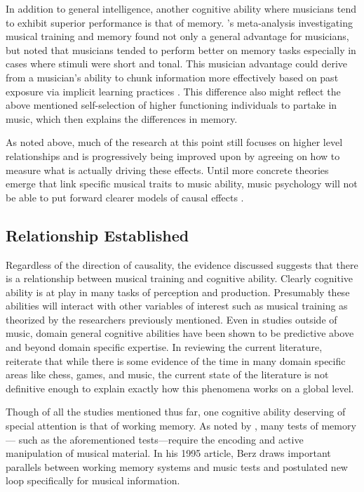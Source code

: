 \documentclass[12pt,]{book}
\begin{document}
In addition to general intelligence, another cognitive ability where musicians tend to exhibit superior performance is that of memory.
\citet{talaminiMusiciansHaveBetter2017}'s meta-analysis investigating musical training and memory found not only a general advantage for musicians, but noted that musicians tended to perform better on memory tasks especially in cases where stimuli were short and tonal.
This musician advantage could derive from a musician's ability to chunk information more effectively based on past exposure via implicit learning practices \citep{ettlingerImplicitMemoryMusic2011, rohrmeierImplicitLearningAcquisition2012}.
This difference also might reflect the above mentioned self-selection of higher functioning individuals to partake in music, which then explains the differences in memory.

As noted above, much of the research at this point still focuses on higher level relationships and is progressively being improved upon by agreeing on how to measure what is actually driving these effects.
Until more concrete theories emerge that link specific musical traits to music ability, music psychology will not be able to put forward clearer models of causal effects \citep{bakerExaminingMusicalSophistication2018a}.

\hypertarget{relationship-established}{%
\subsection{Relationship Established}\label{relationship-established}}

Regardless of the direction of causality, the evidence discussed suggests that there is a relationship between musical training and cognitive ability.
Clearly cognitive ability is at play in many tasks of perception and production.
Presumably these abilities will interact with other variables of interest such as musical training as theorized by the researchers previously mentioned.
Even in studies outside of music, domain general cognitive abilities have been shown to be predictive above and beyond domain specific expertise.
In reviewing the current literature, \citet{hambrickDomainGeneralModelsExpertise2019} reiterate that while there is some evidence of the time in many domain specific areas like chess, games, and music, the current state of the literature is not definitive enough to explain exactly how this phenomena works on a global level.

Though of all the studies mentioned thus far, one cognitive ability deserving of special attention is that of working memory.
As noted by \citet{berzWorkingMemoryMusic1995}, many tests of memory--- such as the aforementioned tests---require the encoding and active manipulation of musical material.
In his 1995 article, Berz draws important parallels between working memory systems and music tests and postulated new loop specifically for musical information.
\end{document}
